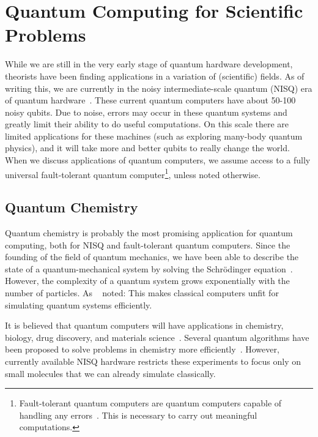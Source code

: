 \documentclass[twocolumn, switch]{article}
\begin{document}
    \section{Quantum Computing for Scientific Problems} \label{sec:quantum-science}
    While we are still in the very early stage of quantum hardware development, theorists have been finding applications in a variation of (scientific) fields.
    As of writing this, we are currently in the noisy intermediate-scale quantum (NISQ) era of quantum hardware~\cite{preskill2018quantum}.
    These current quantum computers have about 50-100 noisy qubits.
    Due to noise, errors may occur in these quantum systems and greatly limit their ability to do useful computations.
    On this scale there are limited applications for these machines (such as exploring many-body quantum physics), and it will take more and better qubits to really change the world.
    When we discuss applications of quantum computers, we assume access to a fully universal fault-tolerant quantum computer\footnote{Fault-tolerant quantum computers are quantum computers capable of handling any errors~\cite{oud2019introduction}. This is necessary to carry out meaningful computations.}, unless noted otherwise.
    
    \subsection{Quantum Chemistry}
    Quantum chemistry is probably the most promising application for quantum computing, both for NISQ and fault-tolerant quantum computers.
    Since the founding of the field of quantum mechanics, we have been able to describe the state of a quantum-mechanical system by solving the Schr{\"o}dinger equation~\cite{griffiths2018introduction}.
    However, the complexity of a quantum system grows exponentially with the number of particles.
    As ~\textcite{dirac1929quantum} noted: 
    This makes classical computers unfit for simulating quantum systems efficiently.

    It is believed that quantum computers will have applications in chemistry, biology, drug discovery, and materials science~\cite{mcardle2018quantum}.
    Several quantum algorithms have been proposed to solve problems in chemistry more efficiently~\cite{lidar1999calculating, kassal2008polynomial, aspuru2005simulated, vqe}.
    However, currently available NISQ hardware restricts these experiments to focus only on small molecules that we can already simulate classically.
    
\end{document}
